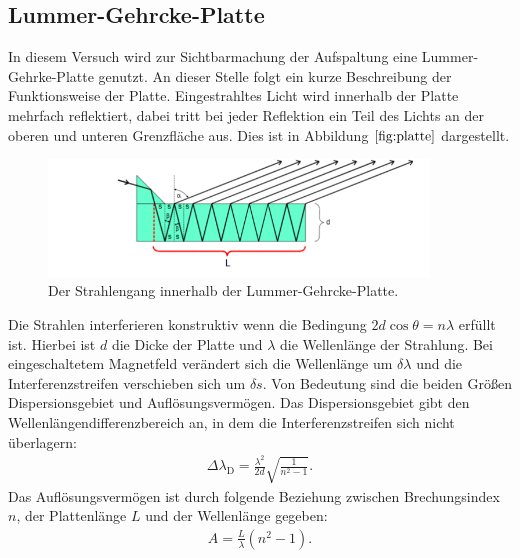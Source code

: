 \subsection{Lummer-Gehrcke-Platte}
In diesem Versuch wird zur Sichtbarmachung der Aufspaltung eine Lummer-Gehrke-Platte genutzt.
An dieser Stelle folgt ein kurze Beschreibung der Funktionsweise der Platte.
Eingestrahltes Licht wird innerhalb der Platte mehrfach reflektiert, dabei tritt bei
jeder Reflektion ein Teil des Lichts an der oberen und unteren Grenzfläche aus.
Dies ist in Abbildung $\ref{fig:platte}$ dargestellt.
\begin{figure}
   \centering
    \includegraphics[width=0.9\textwidth]{platte.PNG}
    \caption{Der Strahlengang innerhalb der Lummer-Gehrcke-Platte.\cite{skript}}
    \label{fig:platte}
\end{figure}
Die Strahlen interferieren konstruktiv wenn die Bedingung $2d\cos{\theta}=n\lambda$
erfüllt ist. Hierbei ist $d$ die Dicke der Platte und $\lambda$ die Wellenlänge der Strahlung.
Bei eingeschaltetem Magnetfeld verändert sich die Wellenlänge um $\delta\lambda$ und
die Interferenzstreifen verschieben sich um $\delta s$.
Von Bedeutung sind die beiden Größen Dispersionsgebiet und Auflösungsvermögen.
Das Dispersionsgebiet gibt den Wellenlängendifferenzbereich an, in dem die
Interferenzstreifen sich nicht überlagern:
\begin{align}
  \Delta\lambda_\mathrm{D}=\frac{\lambda^2}{2d}\sqrt{\frac{1}{n^2-1}} \label{eqn:dispersionsgebiet}.
\end{align}
Das Auflösungsvermögen ist durch folgende Beziehung zwischen Brechungsindex $n$,
der Plattenlänge $L$ und der Wellenlänge gegeben:
\begin{align}
  A=\frac{L}{\lambda}(n^2-1)\label{eqn:aufloesung}.
\end{align}
